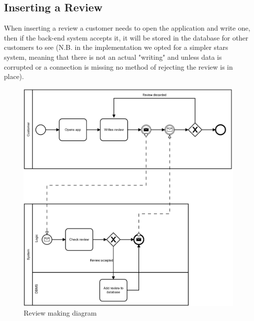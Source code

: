 \subsection{Inserting a Review}
When inserting a review a customer needs to open the application and write one, then if the back-end system accepts it, it will be stored in the database for other customers to see (N.B. in the implementation we opted for a simpler stars system, meaning that there is not an actual "writing" and unless data is corrupted or a connection is missing no method of rejecting the review is in place).
\begin{figure}[!htb]
\centering
\includegraphics[width=1.0\textwidth]{Img/DiagramReview.jpg}
\caption{Review making diagram}
\end{figure}
\clearpage
